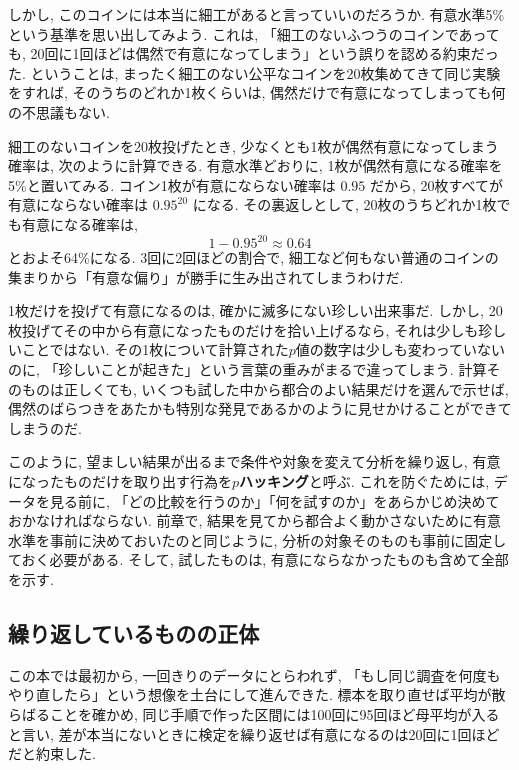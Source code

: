    しかし, このコインには本当に細工があると言っていいのだろうか.
    有意水準5\%という基準を思い出してみよう.
    これは, 「細工のないふつうのコインであっても, 20回に1回ほどは偶然で有意になってしまう」という誤りを認める約束だった.
    ということは, まったく細工のない公平なコインを20枚集めてきて同じ実験をすれば, そのうちのどれか1枚くらいは, 偶然だけで有意になってしまっても何の不思議もない.

    細工のないコインを20枚投げたとき, 少なくとも1枚が偶然有意になってしまう確率は, 次のように計算できる.
    有意水準どおりに, 1枚が偶然有意になる確率を5\%と置いてみる.
    コイン1枚が有意にならない確率は $0.95$ だから, 20枚すべてが有意にならない確率は $0.95^{20}$ になる.
    その裏返しとして, 20枚のうちどれか1枚でも有意になる確率は,
    \[
      1 - 0.95^{20} \approx 0.64
    \]
    とおよそ64\%になる.
    3回に2回ほどの割合で, 細工など何もない普通のコインの集まりから「有意な偏り」が勝手に生み出されてしまうわけだ.

    1枚だけを投げて有意になるのは, 確かに滅多にない珍しい出来事だ.
    しかし, 20枚投げてその中から有意になったものだけを拾い上げるなら, それは少しも珍しいことではない.
    その1枚について計算された$p$値の数字は少しも変わっていないのに, 「珍しいことが起きた」という言葉の重みがまるで違ってしまう.
    計算そのものは正しくても, いくつも試した中から都合のよい結果だけを選んで示せば, 偶然のばらつきをあたかも特別な発見であるかのように見せかけることができてしまうのだ.

    このように, 望ましい結果が出るまで条件や対象を変えて分析を繰り返し, 有意になったものだけを取り出す行為を\textbf{$p$ハッキング}と呼ぶ.
    これを防ぐためには, データを見る前に, 「どの比較を行うのか」「何を試すのか」をあらかじめ決めておかなければならない.
    前章で, 結果を見てから都合よく動かさないために有意水準を事前に決めておいたのと同じように, 分析の対象そのものも事前に固定しておく必要がある.
    そして, 試したものは, 有意にならなかったものも含めて全部を示す.

  \subsection{繰り返しているものの正体}

    この本では最初から, 一回きりのデータにとらわれず, 「もし同じ調査を何度もやり直したら」という想像を土台にして進んできた.
    標本を取り直せば平均が散らばることを確かめ, 同じ手順で作った区間には100回に95回ほど母平均が入ると言い, 差が本当にないときに検定を繰り返せば有意になるのは20回に1回ほどだと約束した.

